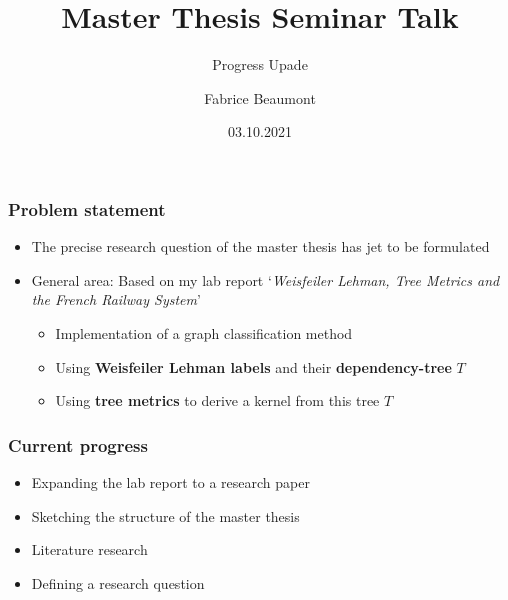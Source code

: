 

\title[MA Seminar Talk - Progress]{Master Thesis Seminar Talk}
\subtitle{Progress Upade}
\author[F. Beaumont]{Fabrice Beaumont}
\date{03.10.2021}

		

\begin{frame}
	\titlepage
\end{frame}

\begin{frame}
\frametitle{Problem statement}
	\begin{itemize}
		\item The precise research question of the master thesis has jet to be formulated\newline
		
		\item General area: Based on my lab report `\textit{Weisfeiler Lehman, Tree Metrics and
			the French Railway System}'
			\begin{itemize}
				\item Implementation of a graph classification method
				\item Using \textbf{Weisfeiler Lehman labels} and their \textbf{dependency-tree} $T$
				\item Using \textbf{tree metrics} to derive a kernel from this tree $T$
			\end{itemize}
	\end{itemize}	
 \end{frame}

\begin{frame}
\frametitle{Current progress}
	\begin{itemize}
		\item Expanding the lab report to a research paper\newline
		\item Sketching the structure of the master thesis\newline
		\item Literature research\newline
		\item Defining a research question
	\end{itemize}	
\end{frame}

